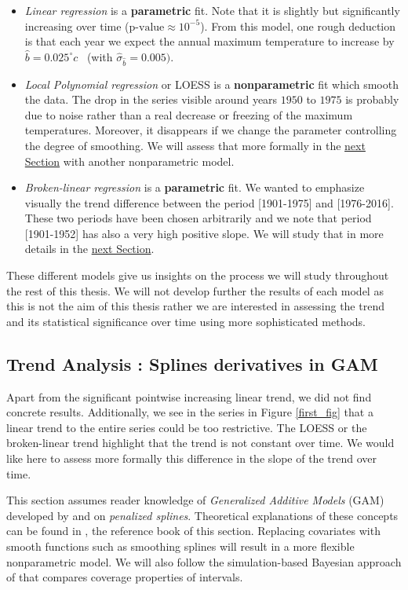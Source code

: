 \begin{itemize}
\item \emph{Linear regression} is a \textbf{parametric} fit. Note that it is slightly but significantly increasing over time ($\text{p-value}\approx 10^{-5}$). From this model, one rough deduction is that each year we expect the annual maximum temperature to increase by $\hat{b}=0.025^{\circ}c$ \  (with $\hat{\sigma}_{\hat{b}}=0.005)$.

\item \emph{Local Polynomial regression } or LOESS is a \textbf{nonparametric} fit which smooth the data. The drop in the series visible around years $1950$ to $1975$ is probably due to noise rather than a real decrease or freezing of the maximum temperatures. Moreover, it disappears if we change the parameter controlling the degree of smoothing. We will assess that more formally in the \hyperref[sec:splines]{next Section} with another nonparametric model.

\item \emph{Broken-linear regression} is a \textbf{parametric} fit. We wanted to emphasize visually the trend difference between the period [1901-1975] and [1976-2016]. These two periods have been chosen arbitrarily and we note that period [1901-1952] has also a very high positive slope. We will study that in more details in the \hyperref[sec:splines]{next Section}.
\end{itemize}
These different models give us insights on the process we will study throughout the rest of this thesis. We will not develop further the results of each model as this is not the aim of this thesis rather we are interested in assessing the trend and its statistical significance over time using more sophisticated methods.


\subsection{Trend Analysis : Splines derivatives in GAM}\label{sec:splines}

Apart from the significant pointwise increasing linear trend, we did not find concrete results. Additionally, we see in the series in Figure \ref{first_fig} that a linear trend to the entire series could be too restrictive. The LOESS or the broken-linear trend highlight that the trend is not constant over time.
We would like here to assess more formally this difference in the slope of the trend over time. 

This section assumes reader knowledge of \emph{Generalized Additive Models} (GAM) developed by \citet{hastie_generalized_1986} and on \emph{penalized splines}. Theoretical explanations of these concepts can be found in \citet[chapter 3, 6 and 11]{ruppert_semiparametric_2003}, the reference book of this section. Replacing covariates with smooth functions such as smoothing splines will result in a more flexible nonparametric model. We will also follow the simulation-based Bayesian approach of \citet{marra_coverage_2012} that compares coverage properties of intervals.


